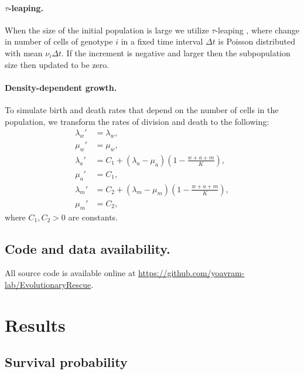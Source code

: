 \documentclass[12pt]{extarticle}
\begin{document}
\paragraph{$\tau$-leaping.}
When the size of the initial population is large we utilize $\tau$-leaping \citep{gillespie2001approximate}, where change in number of cells of genotype $i$ in a fixed time interval $\Delta t$ is Poisson distributed with mean $\nu_i\Delta t$.
If the increment is negative and larger then the subpopulation size then updated to be zero. %

\paragraph{Density-dependent growth.}
To simulate birth and death rates that depend on the number of cells in the population, we transform the rates of division and death to the following:
\begin{align*}
\lambda_w' &= \lambda_w, \\
\mu_w' &= \mu_w,\\
\lambda_a' &= C_1+\left(\lambda_a-\mu_a\right)\left(1-\frac{w+a+m}{K}\right),\\ 
\mu_a' &= C_1,\\
\lambda_m' &= C_2+\left(\lambda_m-\mu_m\right)\left(1-\frac{w+a+m}{K}\right),\\ 
\mu_m' &= C_2,
\end{align*}
where $C_1, C_2>0$ are constants. %

\subsection*{Code and data availability.} All source code is available online at \url{https://github.com/yoavram-lab/EvolutionaryRescue}.

\section*{Results}


\subsection*{Survival probability}
\end{document}
